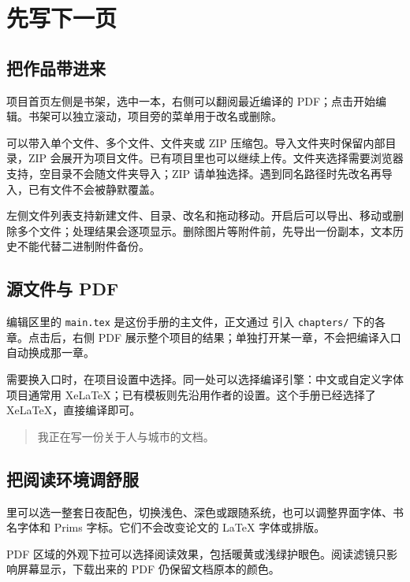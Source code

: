 \section{先写下一页}
\subsection{把作品带进来}
项目首页左侧是书架，选中一本，右侧可以翻阅最近编译的 PDF；点击开始编辑。书架可以独立滚动，项目旁的菜单用于改名或删除。

可以带入单个文件、多个文件、文件夹或 ZIP 压缩包。导入文件夹时保留内部目录，ZIP 会展开为项目文件。已有项目里也可以继续上传。文件夹选择需要浏览器支持，空目录不会随文件夹导入；ZIP 请单独选择。遇到同名路径时先改名再导入，已有文件不会被静默覆盖。

左侧文件列表支持新建文件、目录、改名和拖动移动。开启后可以导出、移动或删除多个文件；处理结果会逐项显示。删除图片等附件前，先导出一份副本，文本历史不能代替二进制附件备份。

\subsection{源文件与 PDF}
编辑区里的 \texttt{main.tex} 是这份手册的主文件，正文通过 \verb|| 引入 \texttt{chapters/} 下的各章。点击后，右侧 PDF 展示整个项目的结果；单独打开某一章，不会把编译入口自动换成那一章。

需要换入口时，在项目设置中选择。同一处可以选择编译引擎：中文或自定义字体项目通常用 XeLaTeX；已有模板则先沿用作者的设置。这个手册已经选择了 XeLaTeX，直接编译即可。

\begin{quote}我正在写一份关于人与城市的文档。\end{quote}

\subsection{把阅读环境调舒服}
里可以选一整套日夜配色，切换浅色、深色或跟随系统，也可以调整界面字体、书名字体和 Prims 字标。它们不会改变论文的 LaTeX 字体或排版。

PDF 区域的外观下拉可以选择阅读效果，包括暖黄或浅绿护眼色。阅读滤镜只影响屏幕显示，下载出来的 PDF 仍保留文档原本的颜色。
